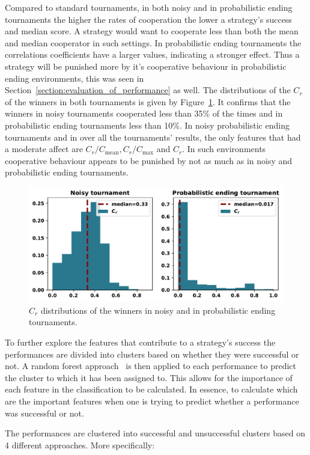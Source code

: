 \documentclass{article}
\begin{document}
Compared to standard tournaments, in both noisy and in probabilistic ending
tournaments the higher the rates of cooperation the lower a strategy's success
and median score. A strategy would want to cooperate less than both
the mean and median cooperator in such settings. In probabilistic ending
tournaments the correlations coefficients have a larger values, indicating a
stronger effect. Thus a strategy will be punished more by it's cooperative
behaviour in probabilistic ending environments, this was seen in Section~\ref{section:evaluation_of_performance}
as well. The distributions of the $C_r$ of the winners in
both tournaments is given by Figure~\ref{fig:c_r_distributions}. It confirms
that the winners in noisy tournaments cooperated less than 35\% of the times
and in probabilistic ending tournaments less than 10\%.
In noisy probabilistic ending tournaments and in over all the tournaments' results,
the only features that had a moderate affect are $C_r/C_{\text{mean}},
C_r/C_{\text{max}}$ and $C_r$. In such environments cooperative behaviour
appears to be punished by not as much as in noisy and probabilistic ending
tournaments.

\begin{figure}[!htbp]
    \centering
    \includegraphics[width=.65\textwidth]{../images/c_r_winners_tournaments.pdf}
    \caption{$C_r$ distributions of the winners in noisy and in probabilistic
    ending tournaments.}\label{fig:c_r_distributions}
\end{figure}

To further explore the features that contribute to a strategy's success the
performances are divided into clusters based on whether they were successful or
not. A random forest approach~\cite{breiman2001} is then applied to each
performance to predict the cluster to which it has been assigned to. This allows
for the importance of each feature in the classification to be calculated. In
essence, to calculate which are the important features when one is trying to
predict whether a performance was successful or not.

The performances are clustered into successful and unsuccessful clusters based on
4 different approaches. More specifically:
\end{document}
